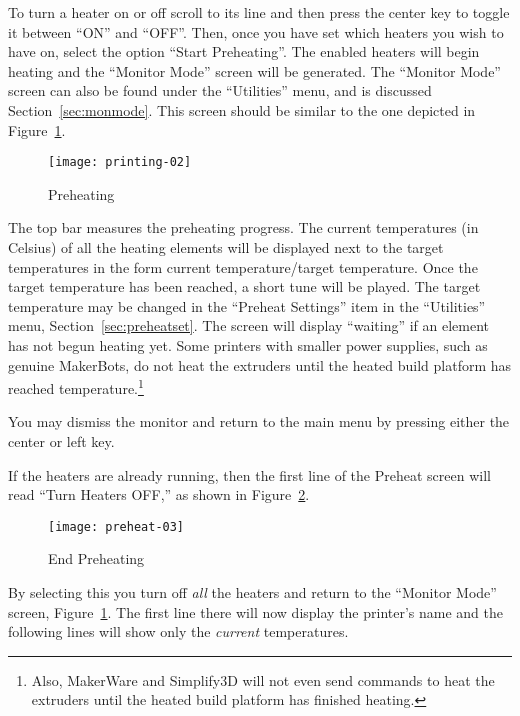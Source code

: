 To turn a heater on or off scroll to its line and then press the center key to toggle it between ``ON'' and ``OFF''.  Then, once you have set which heaters you wish to have on, select the option ``Start Preheating''.  The enabled heaters will begin heating and the ``Monitor Mode'' screen will be generated.  The ``Monitor Mode'' screen can also be found under the ``Utilities'' menu, and is discussed Section~\ref{sec:monmode}.  This screen should be similar to the one depicted in Figure~\ref{fig:heat}.

\begin{figure}[!htbp]
  \centering
    \texttt{[image: printing-02]}
    \caption{Preheating}
  \label{fig:heat}
\end{figure}

The top bar measures the preheating progress.  The current temperatures (in Celsius) of all the heating elements will be displayed next to the target temperatures in the form current temperature/target temperature.  Once the target temperature has been reached, a short tune will be played. The target temperature may be changed in the ``Preheat Settings'' item in the ``Utilities'' menu, Section~\ref{sec:preheatset}.  The screen will display ``waiting'' if an element has not begun heating yet.  Some printers with smaller power supplies, such as genuine MakerBots, do not heat the extruders until the heated build platform has reached temperature.\footnote{Also, MakerWare and Simplify3D will not even send commands to heat the extruders until the heated build platform has finished heating.}

You may dismiss the monitor and return to the main menu by pressing either the center or left key.

If the heaters are already running, then the first line of the Preheat screen will read ``Turn Heaters OFF,'' as shown in Figure~\ref{fig:endheat}.

\begin{figure}[!htbp]
  \centering
    \texttt{[image: preheat-03]}
    \caption{End Preheating}
  \label{fig:endheat}
\end{figure}

By selecting this you turn off \emph{all} the heaters and return to the ``Monitor Mode'' screen, Figure~\ref{fig:heat}.  The first line there will now display the printer's name and the following lines will show only the \emph{current} temperatures.  %


